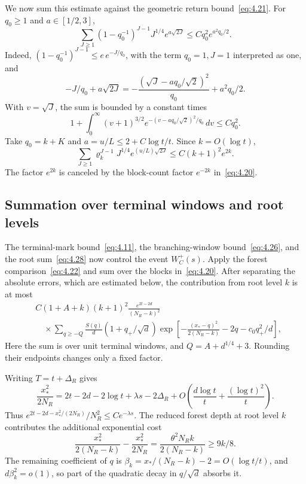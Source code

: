 \documentclass[11pt,letterpaper,reqno]{amsart}
\numberwithin{equation}{section}
\theoremstyle{remark}
\begin{document}
We now sum this estimate against the geometric return bound~\eqref{eq:4.21}. For $q_0\ge1$ and $a\in[1/2,3]$,
\begin{equation}\label{eq:4.27}
\sum_{J\ge1}(1-q_0^{-1})^{J-1}J^{1/4}e^{a\sqrt{2J}}
\le Cq_0^2e^{a^2q_0/2}.
\end{equation}
Indeed, $(1-q_0^{-1})^{J-1}\le e\,e^{-J/q_0}$, with the term $q_0=1,J=1$ interpreted as one, and
\[
-J/q_0+a\sqrt{2J}
=-\frac{(\sqrt J-aq_0/\sqrt2)^2}{q_0}+a^2q_0/2.
\]
With $v=\sqrt J$, the sum is bounded by a constant times
\[
1+\int_0^\infty (v+1)^{3/2}
 e^{-(v-aq_0/\sqrt2)^2/q_0}\,dv\le Cq_0^2.
\]
Take $q_0=k+K$ and $a=u/L\le2+C\log t/t$. Since $k=O(\log t)$,
\begin{equation}\label{eq:4.28}
\sum_{J\ge1}\varrho_k^{J-1}J^{1/4}e^{(u/L)\sqrt{2J}}
\le C(k+1)^2e^{2k}.
\end{equation}
The factor $e^{2k}$ is canceled by the block-count factor $e^{-2k}$ in~\eqref{eq:4.20}.

\subsection{Summation over terminal windows and root levels}\label{sec:uppersum}
The terminal-mark bound~\eqref{eq:4.11}, the branching-window bound~\eqref{eq:4.26}, and the root sum~\eqref{eq:4.28} now control the event $W_C^+(s)$. Apply the forest comparison~\eqref{eq:4.22} and sum over the blocks in~\eqref{eq:4.20}. After separating the absolute errors, which are estimated below, the contribution from root level $k$ is at most
\begin{equation}\label{eq:4.29}
\begin{split}
&C(1+A+k)(k+1)^2\frac{e^{2t-2d}}{(N_R-k)^2}\\
&\quad\times\sum_{q\ge-Q}\frac{S(q)}d
(1+q_+/\sqrt d)
\exp\left[-\frac{(x_*-q)^2}{2(N_R-k)}-2q-c_0q_+^2/d\right],
\end{split}
\end{equation}
Here the sum is over unit terminal windows, and $Q=A+d^{1/4}+3$. Rounding their endpoints changes only a fixed factor.

Writing $T=t+\Delta_R$ gives
\begin{equation}\label{eq:4.30}
\frac{x_*^2}{2N_R}
=2t-2d-2\log t+\lambda s-2\Delta_R
+O\left(\frac{d\log t}{t}+\frac{(\log t)^2}{t}\right).
\end{equation}
Thus $e^{2t-2d-x_*^2/(2N_R)}/N_R^2\le Ce^{-\lambda s}$. The reduced forest depth at root level $k$ contributes the additional exponential cost
\begin{equation}\label{eq:4.31}
\frac{x_*^2}{2(N_R-k)}-\frac{x_*^2}{2N_R}
=\frac{\theta^2 N_R k}{2(N_R-k)}\ge9k/8.
\end{equation}
The remaining coefficient of $q$ is
$\beta_k=x_* /(N_R-k)-2=O(\log t/t)$, and $d\beta_k^2=o(1)$, so part of the quadratic decay in $q/\sqrt d$ absorbs it.
\end{document}
